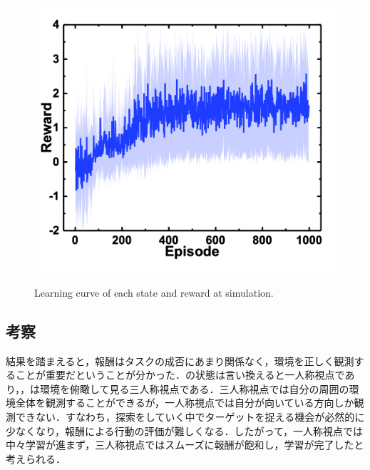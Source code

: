 \begin{figure}[H]
\begin{minipage}[t]{0.45\linewidth}
        \label{fig:報酬距離}
    \end{minipage}
    \begin{minipage}[t]{0.5\linewidth}
        \centering
        \includegraphics[width=0.95\linewidth]{figure/chapter3/QL_rew=redArea_obs=posvec_origin}
        \label{fig:報酬面積}
    \end{minipage}
    \caption{Learning curve of each state and reward at simulation.}
    \label{fig:シミュレーション結果}
\end{figure}


\subsection{考察}
結果を踏まえると，報酬はタスクの成否にあまり関係なく，環境を正しく観測することが重要だということが分かった．の状態は言い換えると一人称視点であり，，は環境を俯瞰して見る三人称視点である．三人称視点では自分の周囲の環境全体を観測することができるが，一人称視点では自分が向いている方向しか観測できない．すなわち，探索をしていく中でターゲットを捉える機会が必然的に少なくなり，報酬による行動の評価が難しくなる．したがって，一人称視点では中々学習が進まず，三人称視点ではスムーズに報酬が飽和し，学習が完了したと考えられる．


